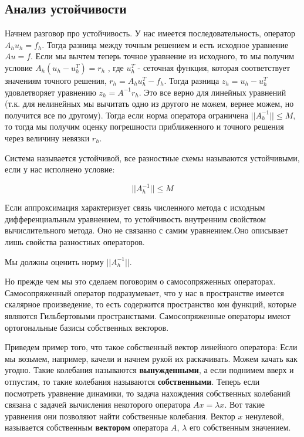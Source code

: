 \subsection*{Анализ устойчивости}

Начнем разговор про устойчивость. У нас имеется последовательность, оператор $A_h u_h = f_h$. Тогда разница между точным решением и есть исходное уравнение $Au = f$. Если мы вычтем теперь точное уравнение из исходного, то мы получим условие $A_h (u_h - u_h^T) = r_h$ , где $u_h^T$ - сеточная функция, которая соответствует значениям точного решения, $r_h = A_h u_h^T - f_h$. Тогда разница $z_h = u_h - u_h^T$ удовлетворяет уравнению $z_h = A^{-1} r_h$. Это все верно для линейных уравнений (т.к. для нелинейных мы вычитать одно из другого не можем, вернее можем, но получится все по другому). Тогда если норма оператора ограничена $||A^{-1}_h|| \leq M$, то тогда мы получим оценку погрешности приближенного и точного решения через величину невязки $r_h$.

\begin{definition}
	Система называется устойчивой, все разностные схемы называются устойчивыми, если у нас исполнено условие:
	
	\begin{equation}
		\label{eq:cond-stable}
		||A^{-1}_h|| \leq M
	\end{equation}	

\end{definition}

\begin{mdframed}
	Если аппроксимация характеризует связь численного метода с исходным дифференциальным уравнением, то устойчивость внутренним свойством вычислительного метода. Оно не связанно с самим уравнением.Оно описывает лишь свойства разностных операторов.
\end{mdframed}

Мы должны оценить норму $||A^{-1}_h||$.

Но прежде чем мы это сделаем поговорим о самосопряженных операторах. Самосопряженный оператор подразумевает, что у нас в пространстве имеется скалярное произведение, то есть содержится пространство кон функций, которые являются Гильбертовыми пространствами. Самосопряженные операторы имеют ортогональные базисы собственных векторов.


\begin{mdframed}
	Приведем пример того, что такое собственный вектор линейного оператора: Если мы возьмем, например, качели и начнем рукой их раскачивать. Можем качать как угодно. Такие колебания называются \textbf{вынужденными}, а если поднимем вверх и отпустим, то такие колебания называются \textbf{собственными}. Теперь если посмотреть уравнение динамики, то задача нахождения собственных колебаний связана с задачей вычисления некоторого оператора $Ax = \lambda x$. Вот такие уравнения они позволяют найти собственные колебания. Вектор $x$ ненулевой, называется собственным \textbf{вектором} оператора $A$, $\lambda$ его собственным значением.
\end{mdframed}

